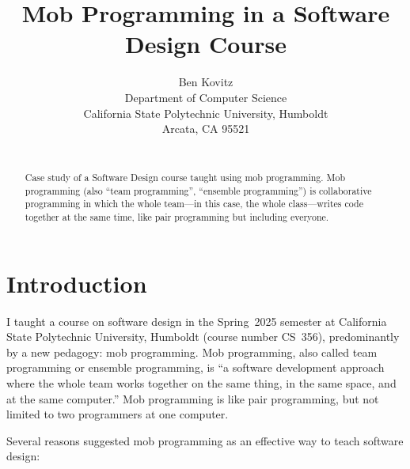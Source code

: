 \documentclass{article}
\title{Mob Programming in a Software Design Course}
\author{
Ben Kovitz \\
Department of Computer Science \\
California State Polytechnic University, Humboldt \\
Arcata, CA 95521 \\
\email{blk14@humboldt.edu}\\
}
\begin{document}
\maketitle

\begin{abstract}
Case study of a Software Design course taught using mob programming. Mob
programming (also ``team programming'', ``ensemble programming'') is
collaborative programming in which the whole team---in this case, the
whole class---writes code together at the same time, like pair programming
but including everyone.
\end{abstract}

\section{Introduction}
I taught a course on software design in the Spring~2025 semester at
California State Polytechnic University, Humboldt (course number CS~356),
predominantly by a new pedagogy: mob programming. Mob programming,
also called team programming or ensemble programming, is ``a software
development approach where the whole team works together on the same thing,
in the same space, and at the same computer.''\cite{zuill2022software}
Mob programming is like pair programming, but not limited to two programmers
at one computer.

Several reasons suggested mob programming as an effective way to teach
software design:
\end{document}
